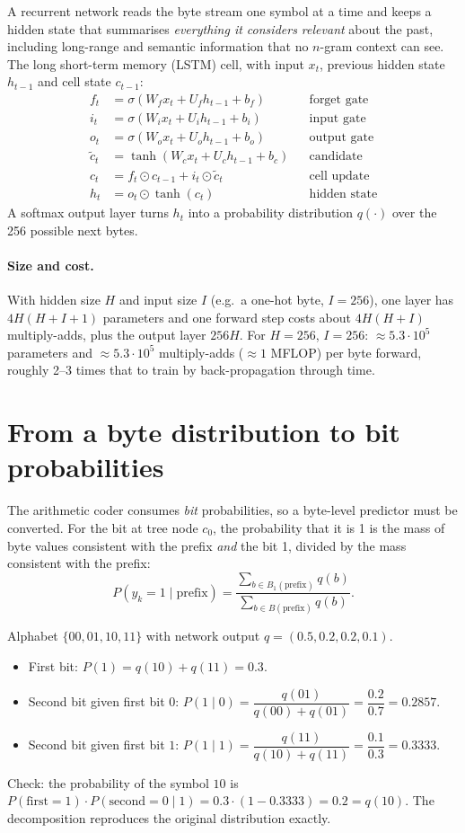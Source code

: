 \documentclass[11pt,a4paper,openany]{book}
\theoremstyle{definition}
\theoremstyle{remark}
\begin{document}
A recurrent network reads the byte stream one symbol at a time and keeps a hidden state that summarises \emph{everything it considers relevant} about the past, including long-range and semantic information that no $n$-gram context can see. The long short-term memory (LSTM) cell, with input $x_t$, previous hidden state $h_{t-1}$ and cell state $c_{t-1}$:
\begin{align*}
f_t&=\sigma(W_fx_t+U_fh_{t-1}+b_f)&&\text{forget gate}\\
i_t&=\sigma(W_ix_t+U_ih_{t-1}+b_i)&&\text{input gate}\\
o_t&=\sigma(W_ox_t+U_oh_{t-1}+b_o)&&\text{output gate}\\
\tilde c_t&=\tanh(W_cx_t+U_ch_{t-1}+b_c)&&\text{candidate}\\
c_t&=f_t\odot c_{t-1}+i_t\odot\tilde c_t&&\text{cell update}\\
h_t&=o_t\odot\tanh(c_t)&&\text{hidden state}
\end{align*}
A softmax output layer turns $h_t$ into a probability distribution $q(\cdot)$ over the 256 possible next bytes.

\paragraph{Size and cost.} With hidden size $H$ and input size $I$ (e.g.\ a one-hot byte, $I=256$), one layer has $4H(H+I+1)$ parameters and one forward step costs about $4H(H+I)$ multiply-adds, plus the output layer $256H$. For $H=256$, $I=256$: $\approx5.3\cdot10^5$ parameters and $\approx5.3\cdot10^5$ multiply-adds ($\approx1$ MFLOP) per byte forward, roughly 2--3 times that to train by back-propagation through time.

\section{From a byte distribution to bit probabilities}

The arithmetic coder consumes \emph{bit} probabilities, so a byte-level predictor must be converted. For the bit at tree node $c_0$, the probability that it is 1 is the mass of byte values consistent with the prefix \emph{and} the bit 1, divided by the mass consistent with the prefix:
\[
P(y_k=1\mid\text{prefix})=\frac{\sum_{b\in B_1(\text{prefix})}q(b)}{\sum_{b\in B(\text{prefix})}q(b)}.
\]

\begin{example}
Alphabet $\{00,01,10,11\}$ with network output $q=(0.5,0.2,0.2,0.1)$.
\begin{itemize}
\item First bit: $P(1)=q(10)+q(11)=0.3$.
\item Second bit given first bit $0$: $P(1\mid0)=\dfrac{q(01)}{q(00)+q(01)}=\dfrac{0.2}{0.7}=0.2857$.
\item Second bit given first bit $1$: $P(1\mid1)=\dfrac{q(11)}{q(10)+q(11)}=\dfrac{0.1}{0.3}=0.3333$.
\end{itemize}
Check: the probability of the symbol $10$ is $P(\text{first}=1)\cdot P(\text{second}=0\mid1)=0.3\cdot(1-0.3333)=0.2=q(10)$. The decomposition reproduces the original distribution exactly.
\end{example}
\end{document}
